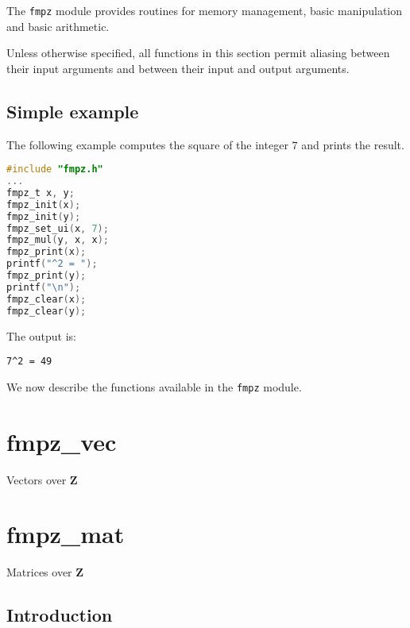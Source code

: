 \documentclass[a4paper,10pt]{book}
\newcommand{\Z}{\mathbf{Z}}%
\newcommand{\code}{\lstinline}
\begin{document}
The \code{fmpz} module provides routines for memory management, basic 
manipulation and basic arithmetic.

Unless otherwise specified, all functions in this section permit aliasing 
between their input arguments and between their input and output 
arguments.

\section{Simple example}

The following example computes the square of the integer $7$ and prints 
the result.
\begin{lstlisting}[language=c]
#include "fmpz.h"
...
fmpz_t x, y;
fmpz_init(x);
fmpz_init(y);
fmpz_set_ui(x, 7);
fmpz_mul(y, x, x);
fmpz_print(x);
printf("^2 = ");
fmpz_print(y);
printf("\n");
fmpz_clear(x);
fmpz_clear(y);
\end{lstlisting}

The output is:
\begin{lstlisting}
7^2 = 49
\end{lstlisting}

We now describe the functions available in the \code{fmpz} module.




\chapter{fmpz\_vec}
\epigraph{Vectors over $\Z$}{}




\chapter{fmpz\_mat}
\epigraph{Matrices over $\Z$}{}

\section{Introduction}
\end{document}
